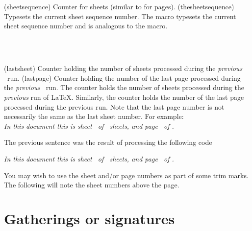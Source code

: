 \begin{syntax}
 \\
\cmd{\thesheetsequence} \\
\end{syntax}
\glossary(sheetsequence)%
  {}%
  {Counter for sheets (similar to  for pages).}
\glossary(thesheetsequence)%
  {}%
  {Typesets the current sheet sequence number.}
The macro \cmd{\thesheetsequence} typesets the current sheet sequence number
and is analogous to the \cmd{\thepage} macro.

\begin{syntax}
 \\
 \\
\end{syntax}
\glossary(lastsheet)%
  {}%
  {Counter holding the number of sheets processed during the \emph{previous}
   \ltx\ run.}
\glossary(lastpage)%
  {}%
  {Counter holding the number of the last page processed during the \emph{previous}
   \ltx\ run.}
The counter  holds the number of sheets processed during
the \emph{previous} run of LaTeX. Similarly, the counter 
holds the number of the last page processed during the previous run.
Note that the last page number is not necessarily the same as the last
sheet number. For example: \\
\textit{In this document this is 
        sheet \thesheetsequence\ of \thelastsheet\ sheets, 
        and page \thepage\ of \thelastpage.}

The previous sentence was the result of processing the following
code 
\begin{lcode}
\textit{In this document this is 
        sheet \thesheetsequence\ of \thelastsheet\ sheets, 
        and page \thepage\ of \thelastpage.}
\end{lcode}

    You may wish to use the sheet and/or page numbers as part of some
trim marks. The following will note the sheet numbers above the page.
\begin{lcode}
\newcommand*{\trimseqpage}{%
  \begin{picture}(0,0)
    \unitlength 1mm
    \put(0,2){\makebox(0,0)[b]{Sheet: \thesheetsequence\ of \thelastsheet}}
  \end{picture}}
\let\tmarktm\trimseqpage
\end{lcode}

\section{Gatherings or signatures}

